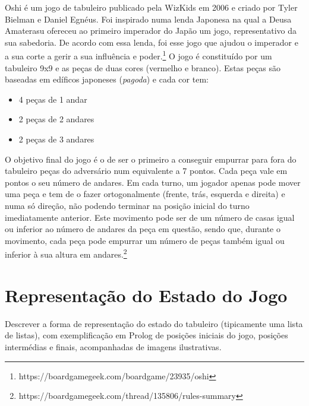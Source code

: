 \documentclass[a4paper]{article}
\begin{document}
Oshi é um jogo de tabuleiro publicado pela WizKids em 2006 e criado por Tyler Bielman e Daniel Egnéus. Foi inspirado numa lenda Japonesa na qual a Deusa Amaterasu ofereceu ao primeiro imperador do Japão um jogo, representativo da sua sabedoria. De acordo com essa lenda, foi esse jogo que ajudou o imperador e a sua corte a gerir a sua influência e poder.\footnote{\label{note1}https://boardgamegeek.com/boardgame/23935/oshi}
\newline
\newline
O jogo é constituído por um tabuleiro 9x9 e as peças de duas cores (vermelho e branco). Estas peças são baseadas em edíficos japoneses (\textit{pagoda}) e cada cor tem:
\begin{itemize}
	\item 4 peças de 1 andar
	\item 2 peças de 2 andares
	\item 2 peças de 3 andares
\end{itemize}
\newline
\newline
O objetivo final do jogo é o de ser o primeiro a conseguir empurrar para fora do tabuleiro peças do adversário num equivalente a 7 pontos. Cada peça vale em pontos o seu número de andares.
\newline
\newline
Em cada turno, um jogador apenas pode mover uma peça e tem de o fazer ortogonalmente (frente, trás, esquerda e direita) e numa só direção, não podendo terminar na posição inicial do turno imediatamente anterior.
\newline
\newline
Este movimento pode ser de um número de casas igual ou inferior ao número de andares da peça em questão, sendo que, durante o movimento, cada peça pode empurrar um número de peças também igual ou inferior à sua altura em andares.\footnote{\label{note2}https://boardgamegeek.com/thread/135806/rules-summary}

\section{Representação do Estado do Jogo}

Descrever a forma de representação do estado do tabuleiro (tipicamente uma lista de listas), com exemplificação em Prolog de posições iniciais do jogo, posições intermédias e finais, acompanhadas de imagens ilustrativas.


\end{document}

